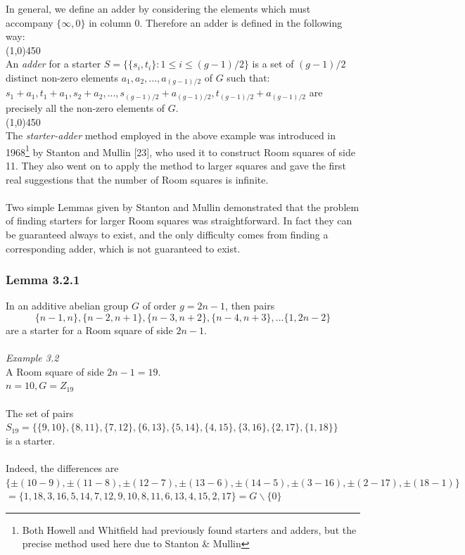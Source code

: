 \documentclass[
  12pt,
  a4paper]{book}
\begin{document}
In general, we define an adder by considering the elements which must
accompany \(\{\infty,0\}\) in column 0. Therefore an adder is defined in
the following way:\\
(1,0){450}\\
An \emph{adder} for a starter
\(S=\{\{s_i,t_i\}: 1 \leq i \leq (g-1)/2 \}\) is a set of \((g-1)/2\)
distinct non-zero elements \(a_1,a_2,...,a_{(g-1)/2}\) of \(G\) such
that:
\(s_1 + a_1,t_1 + a_1,s_2 + a_2,...,s_{(g-1)/2} + a_{(g-1)/2}, t_{(g-1)/2}+a_{(g-1)/2}\)
are precisely all the non-zero elements of \(G\).\\
(1,0){450}\\
The \emph{starter-adder} method employed in the above example was
introduced in 1968\footnote{Both Howell and Whitfield had previously
  found starters and adders, but the precise method used here due to
  Stanton \& Mullin} by Stanton and Mullin {[}23{]}, who used it to
construct Room squares of side 11. They also went on to apply the method
to larger squares and gave the first real suggestions that the number of
Room squares is infinite.\\
~\\
Two simple Lemmas given by Stanton and Mullin demonstrated that the
problem of finding starters for larger Room squares was straightforward.
In fact they can be guaranteed always to exist, and the only difficulty
comes from finding a corresponding adder, which is not guaranteed to
exist.

\hypertarget{lemma-3.2.1}{%
\subsubsection{Lemma 3.2.1}\label{lemma-3.2.1}}

In an additive abelian group \(G\) of order \(g=2n-1\), then pairs
\[\{n-1,n\},\{n-2,n+1\},\{n-3,n+2\},\{n-4,n+3\},...\{1,2n-2\}\] are a
starter for a Room square of side \(2n-1\).\\
~\\
\emph{Example 3.2}\\
A Room square of side \(2n-1=19\).\\
\(n=10, G=Z_{19}\)\\
~\\
The set of pairs\\
\(S_{19} = \{\{9,10\},\{8,11\}, \{7,12\}, \{6,13\}, \{5,14\}, \{4,15\}, \{3,16\}, \{2,17\}, \{1,18\}\}\)\\
is a starter.\\
~\\
Indeed, the differences are\\
\(\{\pm(10-9),\pm(11-8),\pm(12-7),\pm(13-6),\pm(14-5),\pm(3-16),\pm(2-17),\pm(18-1)\}\)\\
\(=\{1,18,3,16,5,14,7,12,9,10,8,11,6,13,4,15,2,17\}=G \backslash \{0\}\)
\end{document}
